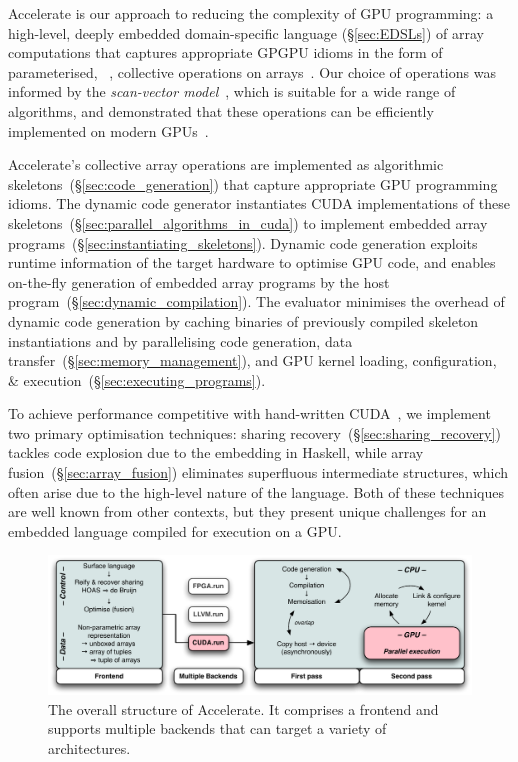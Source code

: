 Accelerate is our approach to reducing the complexity of GPU programming: a
high-level, deeply embedded domain-specific language (\S\ref{sec:EDSLs}) of
array computations that captures appropriate GPGPU\gpgpu{} idioms in the form of
parameterised, ~\cite{Keller:2010er}, collective
operations on arrays~\cite{Chakravarty:2011fr}. Our choice of operations was
informed by the \emph{scan-vector model}~\cite{Chatterjee:1990vj}, which is
suitable for a wide range of algorithms, and demonstrated that these operations
can be efficiently implemented on modern GPUs~\cite{Sengupta:2007tc}.

Accelerate's collective array operations are implemented as algorithmic
skeletons~(\S\ref{sec:code_generation})\skeleton{} that capture appropriate
GPU\gpu{} programming idioms. The dynamic code generator instantiates CUDA
implementations of these skeletons~(\S\ref{sec:parallel_algorithms_in_cuda}) to
implement embedded array programs~(\S\ref{sec:instantiating_skeletons}). Dynamic
code generation exploits runtime information of the target hardware to optimise
GPU code, and enables on-the-fly generation of embedded array programs by the
host program~(\S\ref{sec:dynamic_compilation}). The evaluator minimises the
overhead of dynamic code generation by caching binaries of previously compiled
skeleton instantiations and by parallelising code generation, data
transfer~(\S\ref{sec:memory_management}), and GPU kernel loading, configuration,
\& execution~(\S\ref{sec:executing_programs}).

To achieve performance competitive with hand-written
CUDA~\cite{McDonell:2013wi}\cuda{}, we implement two primary optimisation
techniques: sharing recovery~(\S\ref{sec:sharing_recovery}) tackles code
explosion due to the embedding in Haskell, while array
fusion~(\S\ref{sec:array_fusion})\fusion{} eliminates superfluous intermediate
structures, which often arise due to the high-level nature of the language. Both
of these techniques are well known from other contexts, but they present unique
challenges for an embedded language compiled for execution on a \gpu{}GPU\@.

\begin{figure}
    \centering
    \includegraphics[width=\textwidth]{images/acc/outline-s}
    \caption[The overall structure of Accelerate]{The overall structure of
    Accelerate. It comprises a frontend and supports multiple backends that can
    target a variety of architectures.}
    \label{fig:outline}
\end{figure}

